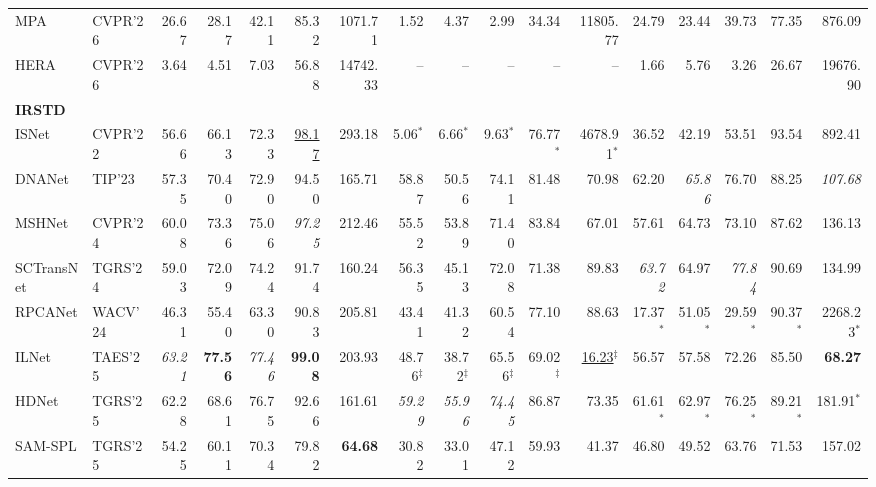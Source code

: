 \begin{table}[!t]
{\begin{tabular}{ll|rrrrr|rrrrr|rrrrr}
MPA & CVPR'26 & 26.67 & 28.17 & 42.11 & 85.32 & 1071.71 & 1.52 & 4.37 & 2.99 & 34.34 & 11805.77 & 24.79 & 23.44 & 39.73 & 77.35 & 876.09 \\
HERA & CVPR'26 & 3.64 & 4.51 & 7.03 & 56.88 & 14742.33 & -- & -- & -- & -- & -- & 1.66 & 5.76 & 3.26 & 26.67 & 19676.90 \\
\hline
\multicolumn{17}{l}{\textbf{IRSTD}} \\
\hline
ISNet & CVPR'22 & 56.66 & 66.13 & 72.33 & \underline{98.17} & 293.18 & 5.06$^{*}$ & 6.66$^{*}$ & 9.63$^{*}$ & 76.77$^{*}$ & 4678.91$^{*}$ & 36.52 & 42.19 & 53.51 & 93.54 & 892.41 \\
DNANet & TIP'23 & 57.35 & 70.40 & 72.90 & 94.50 & 165.71 & 58.87 & 50.56 & 74.11 & 81.48 & 70.98 & 62.20 & \textit{65.86} & 76.70 & 88.25 & \textit{107.68} \\
MSHNet & CVPR'24 & 60.08 & 73.36 & 75.06 & \textit{97.25} & 212.46 & 55.52 & 53.89 & 71.40 & 83.84 & 67.01 & 57.61 & 64.73 & 73.10 & 87.62 & 136.13 \\
SCTransNet & TGRS'24 & 59.03 & 72.09 & 74.24 & 91.74 & 160.24 & 56.35 & 45.13 & 72.08 & 71.38 & 89.83 & \textit{63.72} & 64.97 & \textit{77.84} & 90.69 & 134.99 \\
RPCANet & WACV'24 & 46.31 & 55.40 & 63.30 & 90.83 & 205.81 & 43.41 & 41.32 & 60.54 & 77.10 & 88.63 & 17.37$^{*}$ & 51.05$^{*}$ & 29.59$^{*}$ & 90.37$^{*}$ & 2268.23$^{*}$ \\
ILNet & TAES'25 & \textit{63.21} & \textbf{77.56} & \textit{77.46} & \textbf{99.08} & 203.93 & 48.76$^{\ddagger}$ & 38.72$^{\ddagger}$ & 65.56$^{\ddagger}$ & 69.02$^{\ddagger}$ & \underline{16.23}$^{\ddagger}$ & 56.57 & 57.58 & 72.26 & 85.50 & \textbf{68.27} \\
HDNet & TGRS'25 & 62.28 & 68.61 & 76.75 & 92.66 & 161.61 & \textit{59.29} & \textit{55.96} & \textit{74.45} & 86.87 & 73.35 & 61.61$^{*}$ & 62.97$^{*}$ & 76.25$^{*}$ & 89.21$^{*}$ & 181.91$^{*}$ \\
SAM-SPL & TGRS'25 & 54.25 & 60.11 & 70.34 & 79.82 & \textbf{64.68} & 30.82 & 33.01 & 47.12 & 59.93 & 41.37 & 46.80 & 49.52 & 63.76 & 71.53 & 157.02 \\

\end{tabular}}
\end{table}
